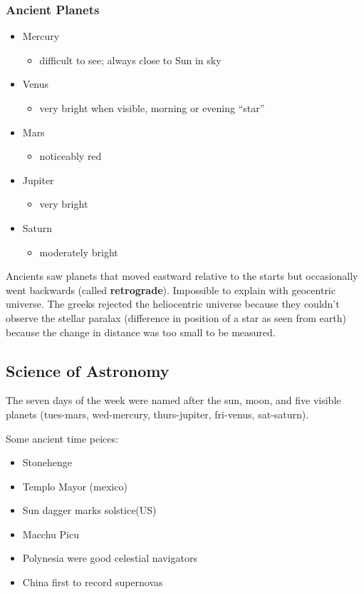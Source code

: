 \documentclass[12pt]{article}
\begin{document}
\subsubsection{Ancient Planets}
\begin{itemize}
\item Mercury
\begin{itemize}
\item difficult to see; always close to Sun in sky
\end{itemize}
\item Venus
\begin{itemize}
\item very bright when visible, morning or evening ``star''
\end{itemize}
\item Mars
\begin{itemize}
\item noticeably red
\end{itemize}
\item Jupiter
\begin{itemize}
\item very bright
\end{itemize}
\item Saturn
\begin{itemize}
\item moderately bright
\end{itemize}
\end{itemize}
Ancients saw planets that moved eastward relative to the starts but occasionally went backwards (called \textbf{retrograde}). Impossible to explain with geocentric universe. The greeks rejected the heliocentric universe because they couldn't observe the stellar paralax (difference in position of a star as seen from earth) because the change in distance was too small to be measured.

\subsection{Science of Astronomy}
The seven days of the week were named after the sun, moon, and five visible planets (tues-mars, wed-mercury, thurs-jupiter, fri-venus, sat-saturn).

Some ancient time peices:
\begin{itemize}
\item Stonehenge
\item Templo Mayor (mexico)
\item Sun dagger marks solstice(US)
\item Macchu Picu
\item Polynesia were good celestial navigators
\item China first to record supernovas
\end{itemize}
\end{document}
